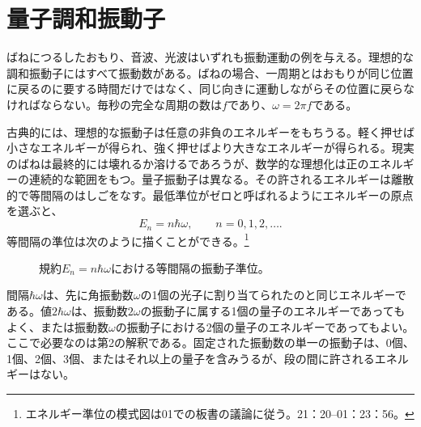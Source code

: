 \begin{classroomqa}
\end{classroomqa}

\section{量子調和振動子}

ばねにつるしたおもり、音波、光波はいずれも振動運動の例を与える。理想的な調和振動子にはすべて振動数がある。ばねの場合、一周期とはおもりが同じ位置に戻るのに要する時間だけではなく、同じ向きに運動しながらその位置に戻らなければならない。毎秒の完全な周期の数は\(f\)であり、\(\omega=2\pi f\)である。

古典的には、理想的な振動子は任意の非負のエネルギーをもちうる。軽く押せば小さなエネルギーが得られ、強く押せばより大きなエネルギーが得られる。現実のばねは最終的には壊れるか溶けるであろうが、数学的な理想化は正のエネルギーの連続的な範囲をもつ。量子振動子は異なる。その許されるエネルギーは離散的で等間隔のはしごをなす。最低準位がゼロと呼ばれるようにエネルギーの原点を選ぶと、
\begin{equation}
E_n=n\hbar\omega,
\qquad n=0,1,2,\ldots .
\end{equation}
等間隔の準位は次のように描くことができる。\footnote{エネルギー準位の模式図は01での板書の議論に従う。21：20--01：23：56。}

\begin{figure}[t]
\centering
{}
\caption{規約\(E_n=n\hbar\omega\)における等間隔の振動子準位。}
\end{figure}

間隔\(\hbar\omega\)は、先に角振動数\(\omega\)の1個の光子に割り当てられたのと同じエネルギーである。値\(2\hbar\omega\)は、振動数\(2\omega\)の振動子に属する1個の量子のエネルギーであってもよく、または振動数\(\omega\)の振動子における2個の量子のエネルギーであってもよい。ここで必要なのは第2の解釈である。固定された振動数の単一の振動子は、0個、1個、2個、3個、またはそれ以上の量子を含みうるが、段の間に許されるエネルギーはない。

